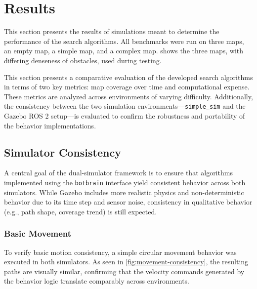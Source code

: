 \section{Results}
\label{sec:results}
This section presents the results of simulations meant to determine the performance of the search algorithms. All benchmarks were run on three maps, an empty map, a simple map, and a complex map.  shows the three maps, with differing denseness of obstacles, used during testing.

This section presents a comparative evaluation of the developed search algorithms in terms of two key metrics: map coverage over time and computational expense. These metrics are analyzed across environments of varying difficulty. 
Additionally, the consistency between the two simulation environments—\texttt{simple\_sim} and the Gazebo ROS 2 setup—is evaluated to confirm the robustness and portability of the behavior implementations.


\subsection{Simulator Consistency}
A central goal of the dual-simulator framework is to ensure that algorithms implemented using the \texttt{botbrain} interface yield consistent behavior across both simulators. While Gazebo includes more realistic physics and non-deterministic behavior due to its time step and sensor noise, consistency in qualitative behavior (e.g., path shape, coverage trend) is still expected.


\subsubsection{Basic Movement}
To verify basic motion consistency, a simple circular movement behavior was executed in both simulators. As seen in \cref{fig:movement-consistency}, the resulting paths are visually similar, confirming that the velocity commands generated by the behavior logic translate comparably across environments.


